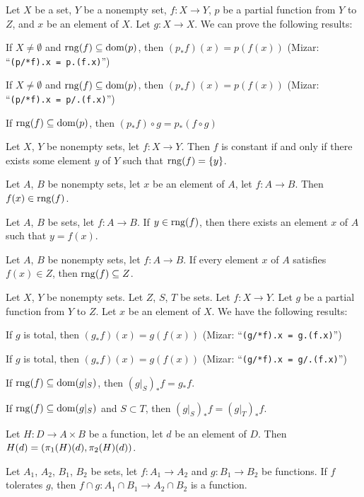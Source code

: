 \documentclass{article}
\begin{document}
Let $X$ be a set, $Y$ be a nonempty set, $f\colon X\to Y$, $p$ be a
partial function from $Y$ to $Z$, and $x$ be an element of $X$. Let
$g\colon X\to X$. We can
prove the following results:
\begin{thm}
\item\label{funct2:108} If $X\neq\emptyset$ and $\operatorname{rng}(f)\subseteq\operatorname{dom}(p)$,
  then $(p_{*}f)(x)=p(f(x))$ (Mizar: ``\verb#(p/*f).x = p.(f.x)#'')
\item\label{funct2:109} If $X\neq\emptyset$ and $\operatorname{rng}(f)\subseteq\operatorname{dom}(p)$,
  then $(p_{*}f)(x)=p(f(x))$ (Mizar: ``\verb#(p/*f).x = p/.(f.x)#'')
\item\label{funct2:110} If $\operatorname{rng}(f)\subseteq\operatorname{dom}(p)$, then $(p_{*}f)\circ g=p_{*}(f\circ g)$
\item\label{funct2:111} Let $X$, $Y$ be nonempty sets, let $f\colon X\to Y$.
  Then $f$ is constant if and only if there exists some element $y$ of
  $Y$ such that $\operatorname{rng}(f)=\{y\}$.
\item\label{funct2:112} Let $A$, $B$ be nonempty sets, let $x$ be an
  element of $A$, let $f\colon A\to B$. Then $f(x)\in\operatorname{rng}(f)$.
\item\label{funct2:113} Let $A$, $B$ be sets, let $f\colon A\to B$.
  If $y\in\operatorname{rng}(f)$, then there exists an element $x$ of $A$ such that $y=f(x)$.
\item\label{funct2:114} Let $A$, $B$ be nonempty sets, let $f\colon A\to B$.
  If every element $x$ of $A$ satisfies $f(x)\in Z$,
  then $\operatorname{rng}(f)\subseteq Z$.
\end{thm}

Let $X$, $Y$ be nonempty sets. Let $Z$, $S$, $T$ be sets. Let $f\colon X\to Y$.
Let $g$ be a partial function from $Y$ to $Z$. Let $x$ be an element of
$X$. We have the following results:
\begin{thm}
\item\label{funct2:115} If $g$ is total, then $(g_{*}f)(x)=g(f(x))$
  (Mizar: ``\verb#(g/*f).x = g.(f.x)#'')
\item\label{funct2:116} If $g$ is total, then $(g_{*}f)(x)=g(f(x))$
  (Mizar: ``\verb#(g/*f).x = g/.(f.x)#'') 
\item\label{funct2:117} If $\operatorname{rng}(f)\subseteq\operatorname{dom}(g|_{S})$, then $(g|_{S})_{*}f=g_{*}f$.
\item\label{funct2:118} If $\operatorname{rng}(f)\subseteq\operatorname{dom}(g|_{S})$ and $S\subset T$,
  then $(g|_{S})_{*}f=(g|_{T})_{*}f$.
\item\label{funct2:119} Let $H\colon D\to A\times B$ be a function, let
  $d$ be an element of $D$. Then $H(d)=(\pi_{1}(H)(d),\pi_{2}(H)(d))$.
\item\label{funct2:120} Let $A_{1}$, $A_{2}$, $B_{1}$, $B_{2}$ be sets,
  let $f\colon A_{1}\to A_{2}$ and $g\colon B_{1}\to B_{2}$ be functions.
  If $f$ tolerates $g$, then $f\cap g\colon A_{1}\cap B_{1}\to A_{2}\cap B_{2}$ is a function.
\end{thm}
\end{document}

